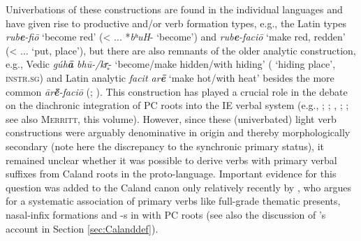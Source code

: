 \documentclass[output=paper,colorlinks,citecolor=brown]{langscibook}
\begin{document}
Univerbations of these constructions are found in the individual languages and have given rise to productive  and/or  verb formation types, e.g., the Latin types \textit{rub\textbf{e}-fiō} `become red' (< ...  *\textit{bʰuH}- `become') and \textit{rub\textbf{e}-faciō} `make red, redden' (< ...  `put, place'), but there are also remnants of the older analytic construction, e.g., Vedic \textit{gúh\textbf{ā}  bhū-/kr̥}- `become/make hidden/with hiding' ( `hiding place',  \textsc{instr.sg}) and Latin analytic \textit{facit ar\textbf{ē}} `make hot/with heat' besides the more common \textit{ār\textbf{ē̆}-faciō}    (\citealt{Hahn1947}; \citealt[138, fn.\ 18]{Weiss2020}).
This construction has played a crucial role in the debate on the diachronic integration of PC roots into the IE verbal system (e.g., \citealt{Schindler1980}; \citealt{Jasanoff2004}; \citealt{Balles2006}, \citeyear{Balles2009}; \citealt{Bozzone2016}; see also \textsc{Merritt}, this volume). However, since these (univerbated) light verb constructions were arguably  denominative in origin and thereby morphologically secondary (note here the discrepancy to the synchronic primary status),  it remained unclear whether it was possible to derive verbs with primary verbal suffixes from Caland roots in the proto-language. Important evidence for this question was added to the Caland canon  only relatively recently by \citet{Rau2009, Rau2013}, who argues for a systematic association of primary verbs  like full-grade thematic presents, nasal-infix formations  and -s in  with PC roots (see also the discussion of \citealt{Bozzone2016}'s account in Section \ref{sec:Calanddef}). 
\end{document}

